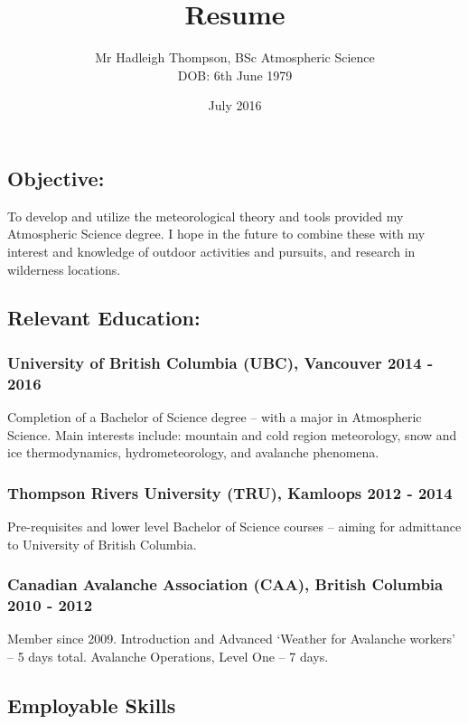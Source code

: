 \documentclass[]{article}
\title{Resume}
\author{Mr Hadleigh Thompson, BSc Atmospheric Science\\ \scriptsize{DOB: 6th June 1979}}
\date{\scriptsize{July 2016}}
\begin{document}
\maketitle

\subsection*{Objective:}  
To develop and utilize the meteorological theory and tools provided my Atmospheric Science degree. I hope in the future to combine these with my interest and knowledge of outdoor activities and pursuits, and research in wilderness locations. 

\subsection*{Relevant Education:}
\subsubsection*{University of British Columbia (UBC), Vancouver 2014 - 2016}
Completion of a Bachelor of Science degree – with a major in Atmospheric Science. Main
interests include: mountain and cold region meteorology, snow and ice thermodynamics,
hydrometeorology, and avalanche phenomena.
\subsubsection*{Thompson Rivers University (TRU), Kamloops 2012 - 2014}
Pre-requisites and lower level Bachelor of Science courses – aiming for admittance to University of British
Columbia.
\subsubsection*{Canadian Avalanche Association (CAA), British Columbia 2010 - 2012}
Member since 2009. Introduction and Advanced ‘Weather for Avalanche workers’ – 5 days total. Avalanche Operations, Level One – 7 days.

\subsection*{Employable Skills}
\end{document}
